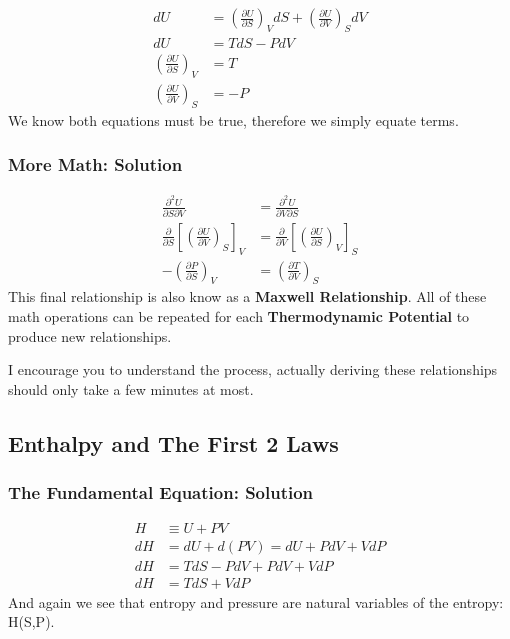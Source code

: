 \documentclass{article}
\newcommand{\be}{\begin{equation}}
\newcommand{\ee}{\end{equation}}
\begin{document}
\begin{equation}
\begin{split}
    dU &= \left( \frac{\partial U}{\partial S} \right)_VdS + \left( \frac{\partial U}{\partial V}  \right)_S dV\\
     dU &= TdS - PdV \\
    \left( \frac{\partial U}{\partial S} \right)_V &= T \\
    \left( \frac{\partial U}{\partial V}  \right)_S &= -P
\end{split}
\end{equation}
We know both equations must be true, therefore we simply equate terms. 

\subsubsection{More Math: Solution}
\begin{equation}
\begin{split}
\frac{\partial ^2 U}{\partial S \partial V} &= \frac{\partial ^2 U}{\partial V \partial S} \\
\frac{\partial }{\partial S}\left[\left(\frac{\partial U}{\partial V}\right)_S\right]_V &= \frac{\partial}{\partial V}\left[\left(\frac{\partial U }{\partial S}\right)_V\right]_S \\
-\left(\frac{\partial P}{\partial S}\right)_V &= \left(\frac{\partial T}{\partial V}\right)_S
\end{split}
\end{equation}
This final relationship is also know as a \textbf{Maxwell Relationship}.
All of these math operations can be repeated for each \textbf{Thermodynamic Potential} to produce new relationships. 

I encourage you to understand the process, actually deriving these relationships should only take a few minutes at most. 

\subsection{Enthalpy and The First 2 Laws}

\subsubsection{The Fundamental Equation: Solution}
\be
    \begin{split}
        H &\equiv U + PV \\
        dH &= dU + d(PV) = dU + PdV + VdP \\
        dH &= TdS - PdV + PdV + VdP \\
        dH &= TdS + VdP
    \end{split}
\ee
And again we see that entropy and pressure are natural variables of the entropy: H(S,P). 
\end{document}
